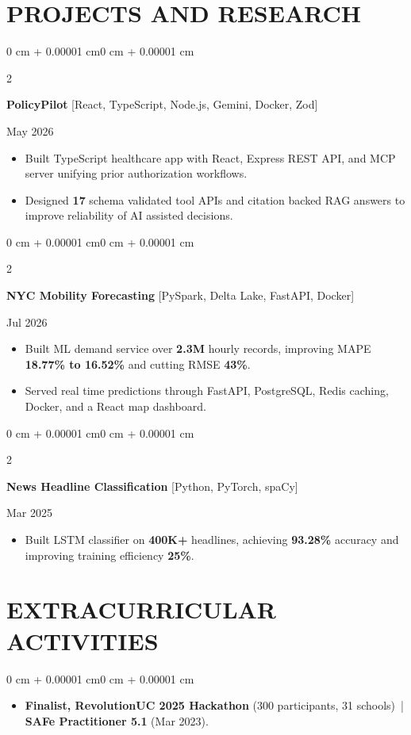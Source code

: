 \documentclass[10pt, letterpaper]{article}
\newenvironment{highlights}{
    \begin{itemize}[
        topsep=0.10 cm,
        parsep=0.06 cm,
        partopsep=0pt,
        itemsep=0.06 cm,
        leftmargin=12pt
    ]
}{
    \end{itemize}
}
\newenvironment{onecolentry}{
    \begin{adjustwidth}{0 cm + 0.00001 cm}{0 cm + 0.00001 cm}
}{
    \end{adjustwidth}
}
\newenvironment{twocolentry}[2][]{
    \onecolentry
    \def\secondColumn{#2}
    \setcolumnwidth{\fill, 4.5 cm}
    \begin{paracol}{2}
}{
    \switchcolumn \raggedleft \secondColumn
    \end{paracol}
    \endonecolentry
}
\begin{document}
\section{PROJECTS AND RESEARCH}
\begin{twocolentry}{May 2026}
\textbf{PolicyPilot} [React, TypeScript, Node.js, Gemini, Docker, Zod]
\end{twocolentry}
\begin{highlights}
  \item Built TypeScript healthcare app with React, Express REST API, and MCP server unifying prior authorization workflows.
  \item Designed \textbf{17} schema validated tool APIs and citation backed RAG answers to improve reliability of AI assisted decisions.
\end{highlights}

\vspace{0.12 cm}

\begin{twocolentry}{Jul 2026}
\textbf{NYC Mobility Forecasting} [PySpark, Delta Lake, FastAPI, Docker]
\end{twocolentry}
\begin{highlights}
  \item Built ML demand service over \textbf{2.3M} hourly records, improving MAPE \textbf{18.77\% to 16.52\%} and cutting RMSE \textbf{43\%}.
  \item Served real time predictions through FastAPI, PostgreSQL, Redis caching, Docker, and a React map dashboard.
\end{highlights}

\vspace{0.12 cm}

\begin{twocolentry}{Mar 2025}
\textbf{News Headline Classification} [Python, PyTorch, spaCy]
\end{twocolentry}
\begin{highlights}
  \item Built LSTM classifier on \textbf{400K+} headlines, achieving \textbf{93.28\%} accuracy and improving training efficiency \textbf{25\%}.
\end{highlights}

\section{EXTRACURRICULAR ACTIVITIES}
\begin{onecolentry}
\begin{highlights}
  \item \textbf{Finalist, RevolutionUC 2025 Hackathon} (300 participants, 31 schools) \,|\, \textbf{SAFe Practitioner 5.1} (Mar 2023).
\end{highlights}
\end{onecolentry}
\end{document}
